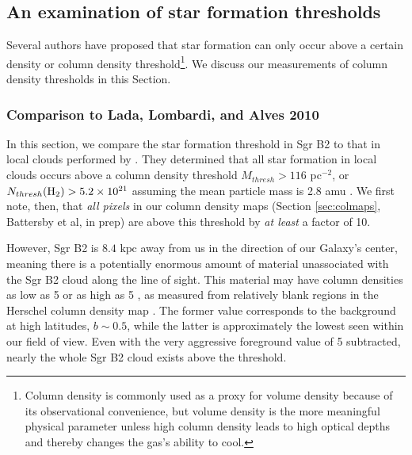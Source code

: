 \documentclass[twocolumn]{aastex61}
\newcommand{\dsgrb}{\ensuremath{8.4\textrm{~kpc}}\xspace}
\begin{document}
\subsection{An examination of star formation thresholds}
\label{sec:thresholds}
Several authors \citep[e.g.,][]{Lada2010a,Heiderman2010a} have proposed that star
formation can only occur above a certain density or column density
threshold\footnote{Column density is commonly used as a proxy for volume
density because of its observational convenience, but volume density is the
more meaningful physical parameter unless high column density leads to high
optical depths and thereby changes the gas's ability to cool.}. 
We discuss our measurements of column density thresholds in this Section.



\subsubsection{Comparison to Lada, Lombardi, and Alves 2010}
\label{sec:ladathreshold}
In this section, we compare the star formation threshold in Sgr B2 to that in
local clouds performed by \citet{Lada2010a}.  They determined that all star
formation in local clouds occurs above a column density threshold $M_{thresh} >
116$ \msun pc$^{-2}$, or $N_{thresh}(\textrm{H}_{2}) > 5.2\times10^{21}$ \persc assuming the
mean particle mass is 2.8 amu \citep{Kauffmann2008a}.  We first note, then,
that \emph{all pixels} in our column density maps (Section \ref{sec:colmaps},
Battersby et al, in prep) are above this threshold by \emph{at least} a factor
of 10.

However, Sgr B2 is \dsgrb away from us in the direction of our Galaxy's
center, meaning there is a potentially enormous amount of material unassociated
with the Sgr B2 cloud along the line of sight.  This material may have column
densities as low as
5 \persc or as high as 5 \persc, as measured from relatively
blank regions in the Herschel column density map \citep{Battersby2011a}.  The
former value corresponds to
the background at high latitudes, $b\sim0.5$, while the latter  is
approximately the lowest seen within our field of view. 
Even with the very aggressive foreground value of 5 \persc subtracted,
nearly the whole Sgr B2 cloud exists above the \citet{Lada2010a} threshold.
\end{document}
